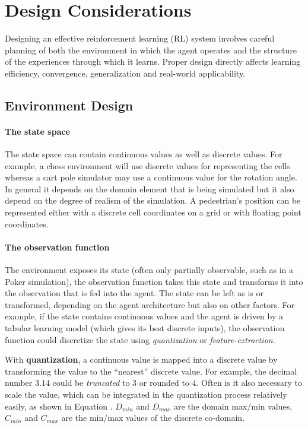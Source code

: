 \section{Design Considerations}

Designing an effective reinforcement learning (RL) system involves careful planning of both the environment in which the agent operates and the structure of the experiences through which it learns. Proper design directly affects learning efficiency, convergence, generalization and real-world applicability.

\subsection{Environment Design}

\paragraph{The state space}

The state space can contain continuous values as well as discrete values. For example, a chess environment will use discrete values for representing the cells whereas a cart pole \cite{nagendra2017comparison} simulator may use a continuous value for the rotation angle. In general it depends on the domain element that is being simulated but it also depend on the degree of realism of the simulation. A pedestrian's position can be represented either with a discrete cell coordinates on a grid or with floating point coordinates.

\paragraph{The observation function}

The environment exposes its state (often only partially observable, such as in a Poker simulation), the observation function takes this state and transforms it into the observation that is fed into the agent.
The state can be left as is or transformed, depending on the agent architecture but also on other factors. For example, if the state contains continuous values and the agent is driven by a tabular learning model (which gives its best discrete inputs), the observation function could discretize the state using \textit{quantization} or \textit{feature-extraction}.

With \textbf{quantization}, a continuous value is mapped into a discrete value by transforming the value to the ``nearest'' discrete value. For example, the decimal number $3.14$ could be \textit{truncated} to $3$ or rounded to $4$. Often is it also necessary to scale the value, which can be integrated in the quantization process relatively easily, as shown in Equation {}. $D_{min}$ and $D_{max}$ are the domain max/min values, $C_{min}$ and $C_{max}$ are the min/max values of the discrete co-domain.

